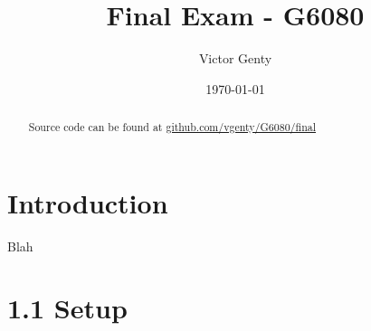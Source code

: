 \documentclass[singlepage,notitlepage,nofootinbib,11pt]{revtex4-1}
\begin{document}
\title{Final Exam - G6080}
\author{Victor Genty}
\date{\today}
\begin{abstract}
\centering
Source code can be found at \href{https://github.com/vgenty/G6080/tree/master/final}{github.com/vgenty/G6080/final}
\end{abstract}
\maketitle
\section*{Introduction}
Blah
\section*{1.1 Setup}
\end{document}
